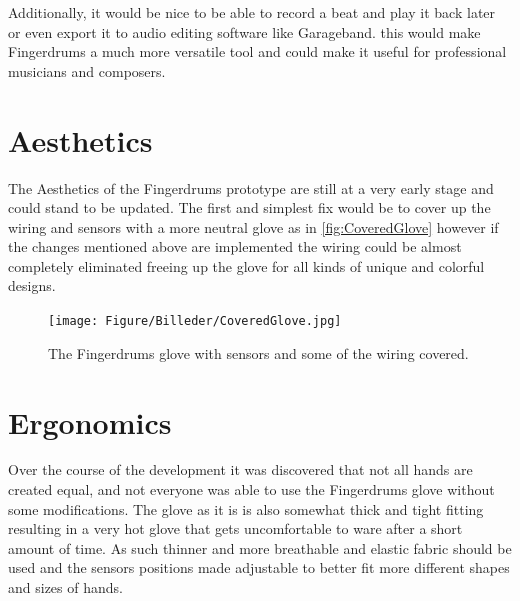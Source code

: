 Additionally, it would be nice to be able to record a beat and play it back later or even export it to audio editing software like Garageband. this would make Fingerdrums a much more versatile tool and could make it useful for professional musicians and composers. 



\section{Aesthetics }
The Aesthetics of the Fingerdrums prototype are still at a very early stage and could stand to be updated. The first and simplest fix would be to cover up the wiring and sensors with a more neutral glove as in \autoref{fig:CoveredGlove} however if the changes mentioned above are implemented the wiring could be almost completely eliminated freeing up the glove for all kinds of unique and colorful designs.

\begin{figure}[H]
\centering
\texttt{[image: Figure/Billeder/CoveredGlove.jpg]}
\caption{The Fingerdrums glove with sensors and some of the wiring covered.}
\label{fig:CoveredGlove}
\end{figure}

\section{Ergonomics}
Over the course of the development it was discovered that not all hands are created equal, and not everyone was able to use the Fingerdrums glove without some modifications. The glove as it is is also somewhat thick and tight fitting resulting in a very hot glove that gets uncomfortable to ware after a short amount of time. As such thinner and more breathable and elastic fabric should be used and the sensors  positions made adjustable to better fit more different shapes and sizes of hands. 